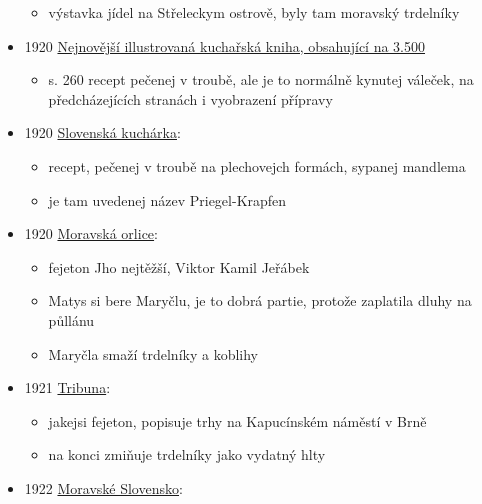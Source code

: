 \begin{itemize}
  \begin{itemize}
  \tightlist
  \item
    výstavka jídel na Střeleckym ostrově, byly tam moravský trdelníky
  \end{itemize}
\item
  1920
  \href{https://ndk.cz/uuid/uuid:d08ced10-7b32-11eb-9f97-005056827e51}{Nejnovější
  illustrovaná kuchařská kniha, obsahující na 3.500 }

  \begin{itemize}
  \tightlist
  \item
    s. 260 recept pečenej v troubě, ale je to normálně kynutej váleček,
    na předcházejících stranách i vyobrazení přípravy
  \end{itemize}
\item
  1920
  \href{https://dikda.snk.sk/uuid/uuid:a65dbdb4-70d4-436e-92af-86192f998fc5}{Slovenská
  kuchárka}:

  \begin{itemize}
  \tightlist
  \item
    recept, pečenej v troubě na plechovejch formách, sypanej mandlema
  \item
    je tam uvedenej název Priegel-Krapfen
  \end{itemize}
\item
  1920
  \href{https://ceskadigitalniknihovna.cz/view/uuid:7a29ece0-be2c-11de-a09c-000d606f5dc6?page=uuid:461eb510-b739-11de-8d2b-000d606f5dc6&fulltext=trdeln\%C3\%AD*&source=mzk}{Moravská
  orlice}:

  \begin{itemize}
  \tightlist
  \item
    fejeton Jho nejtěžší, Viktor Kamil Jeřábek
  \item
    Matys si bere Maryčlu, je to dobrá partie, protože zaplatila dluhy
    na půllánu
  \item
    Maryčla smaží trdelníky a koblihy
  \end{itemize}
\item
  1921
  \href{https://ceskadigitalniknihovna.cz/uuid/uuid:e28419ef-cadc-449a-834c-164adadcc55b}{Tribuna}:

  \begin{itemize}
  \tightlist
  \item
    jakejsi fejeton, popisuje trhy na Kapucínském náměstí v Brně
  \item
    na konci zmiňuje trdelníky jako vydatný hlty
  \end{itemize}
\item
  1922
  \href{https://ndk.cz/view/uuid:d875fc80-2c59-11e4-8f64-005056827e52?page=uuid\%3A4ba3cc00-5b4e-11e4-a6f0-5ef3fc9ae867&fulltext=trdeln\%C3\%ADky}{Moravské
  Slovensko}:


\end{itemize}
